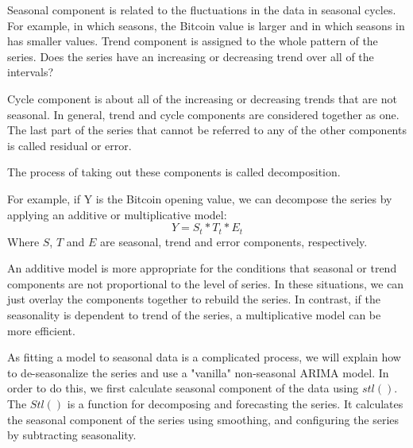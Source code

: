 \documentclass{article}
\begin{document}
Seasonal component is related to the fluctuations in the data in seasonal cycles. For example, in which seasons, the Bitcoin value is larger and in which seasons in has smaller values.
Trend component is assigned to the whole pattern of the series. Does the series have an increasing or decreasing trend over all of the intervals?

Cycle component is about all of the increasing or decreasing trends that are not seasonal. In general, trend and cycle components are considered together as one.
The last part of the series that cannot be referred to any of the other components is called residual or error.

The process of taking out these components is called decomposition. 

For example, if Y is the Bitcoin opening value, we can decompose the series by applying an additive or multiplicative model:
\begin{equation}
Y=S_t*T_t*E_t
\end{equation}
Where $S$, $T$ and $E$ are seasonal, trend and error components, respectively.

An additive model is more appropriate for the conditions that seasonal or trend components are not proportional to the level of series. In these situations, we can just overlay the components together to rebuild the series. In contrast, if the seasonality is dependent to trend of the series, a multiplicative model can be more efficient.

As fitting a model to seasonal data is a complicated process, we will explain how to de-seasonalize the series and use a "vanilla" non-seasonal ARIMA model.
In order to do this, we first calculate seasonal component of the data using $stl()$. The $Stl()$ is a function for decomposing and forecasting the series. It calculates the seasonal component of the series using smoothing, and configuring the series by subtracting seasonality.
  
\end{document}
